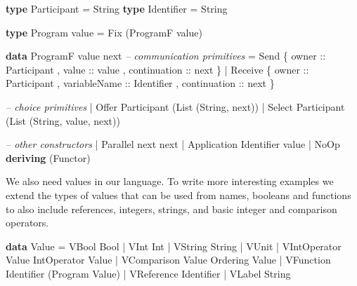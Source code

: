 \documentclass[runningheads,plain]{llncs}
\newenvironment{Shaded}{}{}
\newcommand{\KeywordTok}[1]{\textcolor[rgb]{0.00,0.44,0.13}{\textbf{#1}}}
\newcommand{\DataTypeTok}[1]{\textcolor[rgb]{0.56,0.13,0.00}{#1}}
\newcommand{\CommentTok}[1]{\textcolor[rgb]{0.38,0.63,0.69}{\textit{#1}}}
\newcommand{\OtherTok}[1]{\textcolor[rgb]{0.00,0.44,0.13}{#1}}
\newcommand{\FunctionTok}[1]{\textcolor[rgb]{0.02,0.16,0.49}{#1}}
\newcommand{\NormalTok}[1]{#1}
\begin{document}
\begin{Shaded}
\begin{Highlighting}[]
\KeywordTok{type} \DataTypeTok{Participant} \FunctionTok{=} \DataTypeTok{String}
\KeywordTok{type} \DataTypeTok{Identifier} \FunctionTok{=} \DataTypeTok{String}

\KeywordTok{type} \DataTypeTok{Program}\NormalTok{ value }\FunctionTok{=} \DataTypeTok{Fix}\NormalTok{ (}\DataTypeTok{ProgramF}\NormalTok{ value) }

\KeywordTok{data} \DataTypeTok{ProgramF}\NormalTok{ value next }
    \CommentTok{-- communication primitives}
    \FunctionTok{=} \DataTypeTok{Send} 
\NormalTok{        \{}\OtherTok{ owner ::} \DataTypeTok{Participant}
\NormalTok{        ,}\OtherTok{ value ::}\NormalTok{ value}
\NormalTok{        ,}\OtherTok{ continuation ::}\NormalTok{ next }
\NormalTok{        \}}
    \FunctionTok{|} \DataTypeTok{Receive} 
\NormalTok{        \{}\OtherTok{ owner ::} \DataTypeTok{Participant}
\NormalTok{        ,}\OtherTok{ variableName ::} \DataTypeTok{Identifier}
\NormalTok{        ,}\OtherTok{ continuation ::}\NormalTok{ next  }
\NormalTok{        \}}

    \CommentTok{-- choice primitives}
    \FunctionTok{|} \DataTypeTok{Offer} \DataTypeTok{Participant}\NormalTok{ (}\DataTypeTok{List}\NormalTok{ (}\DataTypeTok{String}\NormalTok{, next))}
    \FunctionTok{|} \DataTypeTok{Select} \DataTypeTok{Participant}\NormalTok{ (}\DataTypeTok{List}\NormalTok{ (}\DataTypeTok{String}\NormalTok{, value, next))}

    \CommentTok{-- other constructors }
    \FunctionTok{|} \DataTypeTok{Parallel}\NormalTok{ next next }
    \FunctionTok{|} \DataTypeTok{Application} \DataTypeTok{Identifier}\NormalTok{ value}
    \FunctionTok{|} \DataTypeTok{NoOp}
    \KeywordTok{deriving}\NormalTok{ (}\DataTypeTok{Functor}\NormalTok{) }
\end{Highlighting}
\end{Shaded}

We also need values in our language. To write more interesting examples
we extend the types of values that can be used from names, booleans and
functions to also include references, integers, strings, and basic
integer and comparison operators.

\begin{Shaded}
\begin{Highlighting}[]
\KeywordTok{data} \DataTypeTok{Value} 
    \FunctionTok{=} \DataTypeTok{VBool} \DataTypeTok{Bool}
    \FunctionTok{|} \DataTypeTok{VInt} \DataTypeTok{Int}
    \FunctionTok{|} \DataTypeTok{VString} \DataTypeTok{String}
    \FunctionTok{|} \DataTypeTok{VUnit}
    \FunctionTok{|} \DataTypeTok{VIntOperator} \DataTypeTok{Value} \DataTypeTok{IntOperator} \DataTypeTok{Value} 
    \FunctionTok{|} \DataTypeTok{VComparison} \DataTypeTok{Value} \DataTypeTok{Ordering} \DataTypeTok{Value}
    \FunctionTok{|} \DataTypeTok{VFunction} \DataTypeTok{Identifier}\NormalTok{ (}\DataTypeTok{Program} \DataTypeTok{Value}\NormalTok{)}
    \FunctionTok{|} \DataTypeTok{VReference} \DataTypeTok{Identifier} 
    \FunctionTok{|} \DataTypeTok{VLabel} \DataTypeTok{String}
\end{Highlighting}
\end{Shaded}
\end{document}
